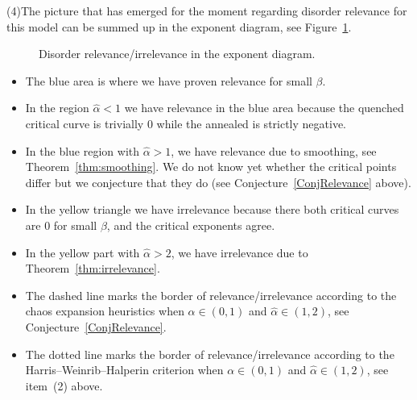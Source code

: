 \documentclass[AHL,Unicode,longabstracts]{cedram}
\newcommand{\ga}{\alpha}
\newcommand{\gb}{\beta}
\newcommand{\ha}{\hat\ga}
\begin{document}
\medskip
\noindent (4)\enskip The picture that has emerged for the moment regarding disorder relevance for this model can be summed up in the exponent diagram, see Figure~\ref{fig.sum}.
\begin{figure}
\begin{center}
\end{center}
\caption{\label{fig.sum}
Disorder relevance/irrelevance in the exponent diagram. }
\end{figure}
\begin{itemize}
\item The blue area is where we have proven relevance for small $\gb$.
\item In the region $\ha < 1$ we have relevance in the blue area because the quenched critical curve is trivially 0 while the annealed is strictly negative.
\item In the blue region with $\ha > 1$, we have relevance due to smoothing, see Theorem~\ref{thm:smoothing}. We do not know yet whether the critical points differ but we conjecture that they do (see Conjecture~\ref{ConjRelevance} above).
\item In the yellow triangle we have irrelevance because there both critical curves are 0 for small $\gb$, and the critical exponents agree.
\item In the yellow part with $\ha > 2$, we have irrelevance due to Theorem~\ref{thm:irrelevance}.
\item The dashed line marks the border of relevance/irrelevance according to the chaos expansion heuristics when $\ga\in(0,1)$ and $\ha\in(1,2)$, see Conjecture~\ref{ConjRelevance}.
\item The dotted line marks the border of relevance/irrelevance according to the Harris--Weinrib--Halperin criterion when $\ga\in(0,1)$ and $\ha\in(1,2)$, see item~(2) above.
\end{itemize}
\end{document}
